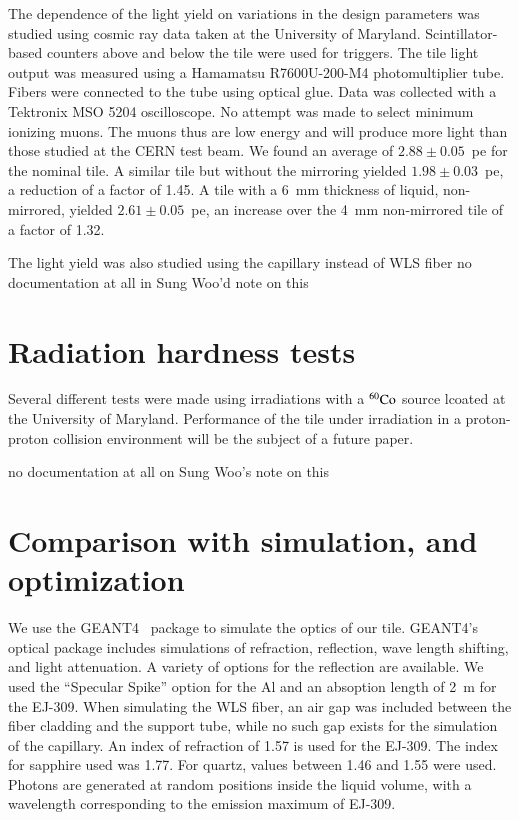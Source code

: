 \documentclass[review]{elsarticle}
\begin{document}
The dependence of the light yield on variations in the design
parameters was studied using cosmic ray data taken at the University
of Maryland. Scintillator-based counters above and below the tile
were used for triggers. The tile light output was measured using a
Hamamatsu R7600U-200-M4 photomultiplier tube. Fibers were connected
to the tube using optical glue. Data was collected with a Tektronix
MSO 5204 oscilloscope. No attempt was made to select minimum ionizing
muons. The muons thus are low energy and will produce more light than
those studied at the CERN test beam. We found an average of 
$2.88\pm 0.05$~pe for the nominal tile. A similar tile but without
the mirroring yielded $1.98\pm 0.03$~pe, a reduction of a factor of
1.45. A tile with a 6~mm thickness of liquid, non-mirrored, yielded
$2.61\pm 0.05$~pe, an increase over the 4~mm non-mirrored tile of a
factor of 1.32.

The light yield was also studied using the capillary instead of WLS
fiber {\color{red} no documentation at all in Sung Woo'd note on this}

\section{Radiation hardness tests}

Several different tests were made using irradiations with a
$\rm{^{60}Co}$ source lcoated at the University of Maryland.
Performance of the tile under irradiation in a proton-proton collision
environment will be the subject of a future paper.


{\color{red} no documentation at all on Sung Woo's note on this}

\section{Comparison with simulation, and optimization}
We use the GEANT4~\cite{Agostinelli2003250} package to simulate the
optics of our tile. GEANT4's optical package includes simulations of
refraction, reflection, wave length shifting, and light attenuation.
A variety of options for the reflection are available. We used the
``Specular Spike'' option for the Al and an absoption length of 2~m for
the EJ-309. When simulating the WLS fiber, an air gap was included
between the fiber cladding and the support tube, while no such gap
exists for the simulation of the capillary. An index of refraction of
1.57 is used for the EJ-309. The index for sapphire used was 1.77.
For quartz, values between 1.46 and 1.55 were used. Photons are
generated at random positions inside the liquid volume, with a
wavelength corresponding to the emission maximum of EJ-309.
\end{document}
